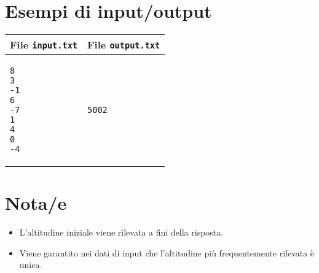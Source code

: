 \documentclass[a4paper,11pt]{article}
\begin{document}
\section*{Esempi di input/output}
    \noindent
    \begin{tabular}{p{11cm}|p{5cm}}
    \toprule
    \textbf{File \texttt{input.txt}}
    & \textbf{File \texttt{output.txt}}
    \\
    \midrule
    \scriptsize
    \begin{verbatim}
8
3
-1
6
-7
1
4
0
-4
\end{verbatim}
    &
    \scriptsize
    \begin{verbatim}
5002
\end{verbatim}
    \\
    \bottomrule
    \end{tabular}

\section*{Nota/e}

\begin{itemize}
  \item L'altitudine iniziale viene rilevata a fini della risposta.
  \item Viene garantito nei dati di input che l'altitudine più
    frequentemente rilevata è unica.
\end{itemize}
\end{document}
